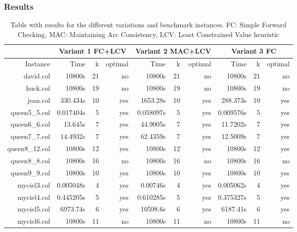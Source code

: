 \documentclass{beamer}
\begin{document}
\begin{frame}
    \frametitle{Results}

\begin{table}
  \tiny
        \begin{center}
          \begin{tabular}{r | r | r | r | r | r | r | r | r | r}
            \hline
             & \multicolumn{3}{c|}{Variant 1 FC+LCV} & \multicolumn{3}{c|}{Variant 2 MAC+LCV} & \multicolumn{3}{c}{Variant 3 FC} \\
            \hline
Instance & Time & k & optimal &  Time & k & optimal & Time & k & optimal \\
\hline \hline 
david.col & 10800s & 21 & no & 10800s & 21 & no & 10800s & 21 & no  \\
huck.col & 10800s & 19 & no & 10800s & 19 & no & 10800s & 19 & no \\
jean.col & 330.434s & 10 & yes & 1653.28s & 10 & yes & 288.373s & 10 & yes \\
queen5\_5.col & 0.017404s & 5 & yes & 0.058097s & 5 & yes & 0.009576s & 5 & yes  \\
queen6\_6.col & 13.645s & 7 & yes &  44.9005s & 7 & yes  & 11.7202s & 7 & yes \\
queen7\_7.col & 14.4932s & 7 & yes  & 62.4359s & 7 & yes & 12.5009s  & 7 & yes \\
queen8\_12.col & 10800s & 12 & yes &  10800s & 12 & yes & 10800s & 12 & yes  \\
queen8\_8.col & 10800s & 16  & no  & 10800s & 16 & no & 10800s & 16 & no \\
queen9\_9.col & 10800s & 10 & yes & 10800s & 10 & yes & 10800s & 10 & yes \\
myciel3.col &  0.005048s & 4 & yes & 0.00746s & 4 & yes  & 0.005062s & 4  & yes \\
myciel4.col & 0.445205s &  5& yes & 0.610285s & 5 & yes & 0.375327s & 5 & yes  \\
myciel5.col & 6973.74s & 6 & yes &10598.6s  & 6 & yes & 6187.41s & 6  & yes \\
myciel6.col & 10800s & 11 & no & 10800s & 11  & no & 10800s & 11 & no \\
\hline
\end{tabular}
        \caption{Table with results for the different variations and benchmark instances. FC: Simple Forward Checking, MAC: Maintaining Arc Consistency, LCV: Least Constrained Value heuristic }
        \label{myTable1}
        \end{center}
\end{table}

\end{frame}
\end{document}
